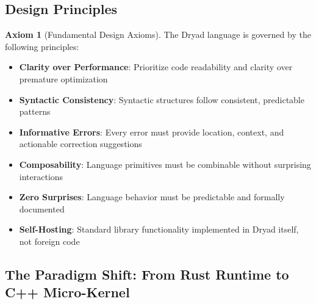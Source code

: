 \documentclass[12pt,a4paper]{article}
\theoremstyle{definition}
\newtheorem{axiom}{Axiom}[section]
\begin{document}
\subsection{Design Principles}

\begin{axiom}[Fundamental Design Axioms]
The Dryad language is governed by the following principles:
\begin{itemize}[leftmargin=*, itemsep=3pt]
    \item \textbf{Clarity over Performance}: Prioritize code readability and clarity over premature optimization
    \item \textbf{Syntactic Consistency}: Syntactic structures follow consistent, predictable patterns
    \item \textbf{Informative Errors}: Every error must provide location, context, and actionable correction suggestions
    \item \textbf{Composability}: Language primitives must be combinable without surprising interactions
    \item \textbf{Zero Surprises}: Language behavior must be predictable and formally documented
    \item \textbf{Self-Hosting}: Standard library functionality implemented in Dryad itself, not foreign code
\end{itemize}
\end{axiom}

\subsection{The Paradigm Shift: From Rust Runtime to C++ Micro-Kernel}
\end{document}

